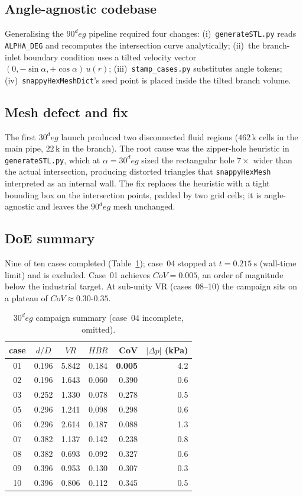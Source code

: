 \documentclass[10pt,a4paper]{article}
\def\dD{d/D}%
\def\VR{VR}%
\def\HBR{HBR}%
\def\CoV{CoV}%
\def\circ{ deg}%
\newcommand{\dD}{\ensuremath{d/D}}
\newcommand{\VR}{\ensuremath{\mathrm{VR}}}
\newcommand{\HBR}{\ensuremath{\mathrm{HBR}}}
\newcommand{\CoV}{\ensuremath{\mathrm{CoV}}}
\begin{document}
\subsection{Angle-agnostic codebase}
Generalising the \(90^\circ\) pipeline required four changes:
(i)~\texttt{generateSTL.py} reads \texttt{ALPHA\_DEG} and
recomputes the intersection curve analytically;
(ii)~the branch-inlet boundary condition uses a tilted velocity
vector \((0,-\sin\alpha,+\cos\alpha)\,u(r)\);
(iii)~\texttt{stamp\_cases.py} substitutes angle tokens;
(iv)~\texttt{snappyHexMeshDict}'s seed point is placed inside the
tilted branch volume.

\subsection{Mesh defect and fix}
\label{sec:30deg_meshfix}
The first \(30^\circ\) launch produced two disconnected fluid
regions (\(462\,\mathrm{k}\) cells in the main pipe,
\(22\,\mathrm{k}\) in the branch).
The root cause was the zipper-hole heuristic in
\texttt{generateSTL.py}, which at \(\alpha=30^\circ\) sized the
rectangular hole \(7\times\) wider than the actual intersection,
producing distorted triangles that \texttt{snappyHexMesh}
interpreted as an internal wall.
The fix replaces the heuristic with a tight bounding box on the
intersection points, padded by two grid cells; it is
angle-agnostic and leaves the \(90^\circ\) mesh unchanged.

\subsection{DoE summary}
Nine of ten cases completed (Table~\ref{tab:30deg_summary});
case~04 stopped at \(t=\SI{0.215}{\second}\) (wall-time limit)
and is excluded.
Case~01 achieves \(\CoV=0.005\), an order of magnitude below the
industrial target.  At sub-unity \VR{} (cases~08--10) the
campaign sits on a plateau of \(\CoV\approx 0.30\)-\(0.35\).

\begin{table}[H]
\centering\scriptsize
\caption{\(30^\circ\) campaign summary (case~04 incomplete, omitted).}
\label{tab:30deg_summary}
\begin{tabular}{ccccrr}
\toprule
case & \(\dD\) & \(\VR\) & \(\HBR\) & \CoV{} & \(|\Delta p|\) (kPa) \\
\midrule
01 & 0.196 & 5.842 & 0.184 & \textbf{0.005} & 4.2 \\
02 & 0.196 & 1.643 & 0.060 & 0.390 & 0.6 \\
03 & 0.252 & 1.330 & 0.078 & 0.278 & 0.5 \\
05 & 0.296 & 1.241 & 0.098 & 0.298 & 0.6 \\
06 & 0.296 & 2.614 & 0.187 & 0.088 & 1.3 \\
07 & 0.382 & 1.137 & 0.142 & 0.238 & 0.8 \\
08 & 0.382 & 0.693 & 0.092 & 0.327 & 0.6 \\
09 & 0.396 & 0.953 & 0.130 & 0.307 & 0.3 \\
10 & 0.396 & 0.806 & 0.112 & 0.345 & 0.5 \\
\bottomrule
\end{tabular}
\end{table}
\end{document}
